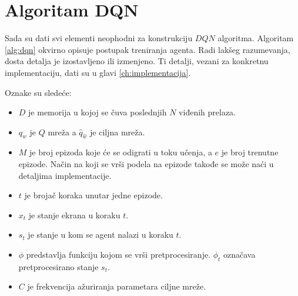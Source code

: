 \section{Algoritam DQN}

Sada su dati svi elementi neophodni za konstrukciju $DQN$ algoritma. Algoritam \ref{alg:dqn} okvirno opisuje postupak treniranja agenta. Radi lakšeg razumevanja, dosta detalja je izostavljeno ili izmenjeno. Ti detalji, vezani za konkretnu implementaciju, dati su u glavi \ref{ch:implementacija}. 
\par 
Oznake su sledeće:
\begin{itemize}
	\item $D$ je memorija u kojoj se čuva poslednjih $N$ viđenih prelaza.
	\item $q_w$ je $Q$ mreža a $\hat{q}_{\hat{w}}$ je ciljna mreža.
	\item $M$ je broj epizoda koje će se odigrati u toku učenja, a $e$ je broj trenutne epizode. Način na koji se vrši podela na epizode takođe se može naći u detaljima implementacije. 
	\item $t$ je brojač koraka unutar jedne epizode.
	\item $x_t$ je stanje ekrana u koraku $t$.
	\item $s_t$ je stanje u kom se agent nalazi u koraku $t$.
	\item $\phi$ predstavlja funkciju kojom se vrši pretprocesiranje. $\phi_t$ označava pretprocesirano stanje $s_t$.
	\item $C$ je frekvencija ažuriranja parametara ciljne mreže.
\end{itemize}

